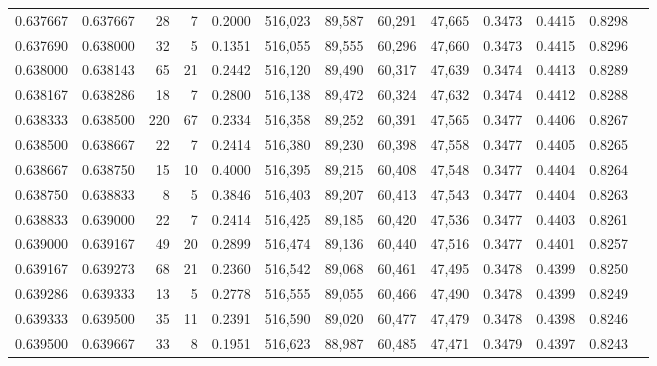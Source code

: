 \begin{tabular}{rrrrrrrrrrrrr}
0.637667 & 0.637667 &    28 &   7 &                                     0.2000 & 516,023 &  89,587 &  60,291 &  47,665 & 0.3473 & 0.4415 & 0.8298 \\
0.637690 & 0.638000 &    32 &   5 &                                     0.1351 & 516,055 &  89,555 &  60,296 &  47,660 & 0.3473 & 0.4415 & 0.8296 \\
0.638000 & 0.638143 &    65 &  21 &                                     0.2442 & 516,120 &  89,490 &  60,317 &  47,639 & 0.3474 & 0.4413 & 0.8289 \\
0.638167 & 0.638286 &    18 &   7 &                                     0.2800 & 516,138 &  89,472 &  60,324 &  47,632 & 0.3474 & 0.4412 & 0.8288 \\
0.638333 & 0.638500 &   220 &  67 &                                     0.2334 & 516,358 &  89,252 &  60,391 &  47,565 & 0.3477 & 0.4406 & 0.8267 \\
0.638500 & 0.638667 &    22 &   7 &                                     0.2414 & 516,380 &  89,230 &  60,398 &  47,558 & 0.3477 & 0.4405 & 0.8265 \\
0.638667 & 0.638750 &    15 &  10 &                                     0.4000 & 516,395 &  89,215 &  60,408 &  47,548 & 0.3477 & 0.4404 & 0.8264 \\
0.638750 & 0.638833 &     8 &   5 &                                     0.3846 & 516,403 &  89,207 &  60,413 &  47,543 & 0.3477 & 0.4404 & 0.8263 \\
0.638833 & 0.639000 &    22 &   7 &                                     0.2414 & 516,425 &  89,185 &  60,420 &  47,536 & 0.3477 & 0.4403 & 0.8261 \\
0.639000 & 0.639167 &    49 &  20 &                                     0.2899 & 516,474 &  89,136 &  60,440 &  47,516 & 0.3477 & 0.4401 & 0.8257 \\
0.639167 & 0.639273 &    68 &  21 &                                     0.2360 & 516,542 &  89,068 &  60,461 &  47,495 & 0.3478 & 0.4399 & 0.8250 \\
0.639286 & 0.639333 &    13 &   5 &                                     0.2778 & 516,555 &  89,055 &  60,466 &  47,490 & 0.3478 & 0.4399 & 0.8249 \\
0.639333 & 0.639500 &    35 &  11 &                                     0.2391 & 516,590 &  89,020 &  60,477 &  47,479 & 0.3478 & 0.4398 & 0.8246 \\
0.639500 & 0.639667 &    33 &   8 &                                     0.1951 & 516,623 &  88,987 &  60,485 &  47,471 & 0.3479 & 0.4397 & 0.8243 \\

\end{tabular}
